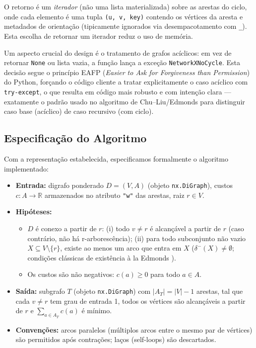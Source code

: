 O retorno é um \emph{iterador} (não uma lista materializada) sobre as arestas do ciclo, onde cada elemento é uma tupla \texttt{(u, v, key)} contendo os vértices da aresta e metadados de orientação (tipicamente ignorados via desempacotamento com \texttt{\_}). Esta escolha de retornar um iterador reduz o uso de memória.

Um aspecto crucial do design é o tratamento de grafos acíclicos: em vez de retornar \texttt{None} ou lista vazia, a função lança a exceção \texttt{NetworkXNoCycle}. Esta decisão segue o princípio EAFP (\emph{Easier to Ask for Forgiveness than Permission}) do Python, forçando o código cliente a tratar explicitamente o caso acíclico com \texttt{try-except}, o que resulta em código mais robusto e com intenção clara — exatamente o padrão usado no algoritmo de Chu--Liu/Edmonds para distinguir caso base (acíclico) de caso recursivo (com ciclo).

\subsection{Especificação do Algoritmo}

Com a representação estabelecida, especificamos formalmente o algoritmo implementado:

\begin{itemize}\setlength{\itemsep}{2pt}
    \item \textbf{Entrada:} digrafo ponderado \(D=(V,A)\) (objeto \texttt{nx.DiGraph}), custos \(c:A\to\mathbb{R}\) armazenados no atributo \texttt{"w"} das arestas, raiz \(r\in V\).
    \item \textbf{Hipóteses:}
          \begin{itemize}\setlength{\itemsep}{2pt}
              \item \(D\) é conexo a partir de \(r\): (i) todo \(v\neq r\) é alcançável a partir de \(r\) (caso contrário, não há r-arborescência); (ii) para todo subconjunto não vazio \(X\subseteq V\setminus\{r\}\), existe ao menos um arco que entra em \(X\) (\(\delta^-(X)\neq\emptyset\); condições clássicas de existência \`a la Edmonds \cite{schrijver2003comb}).
              \item Os custos são não negativos: \(c(a)\ge 0\) para todo \(a\in A\).
          \end{itemize}
    \item \textbf{Saída:} subgrafo \(T\) (objeto \texttt{nx.DiGraph}) com \(|A_T|=|V|-1\) arestas, tal que cada \(v\neq r\) tem grau de entrada 1, todos os vértices são alcançáveis a partir de \(r\) e \(\sum_{a\in A_T} c(a)\) é mínimo.
    \item \textbf{Convenções:} arcos paralelos (múltiplos arcos entre o mesmo par de vértices) são permitidos após contrações; laços (self-loops) são descartados.
\end{itemize}

